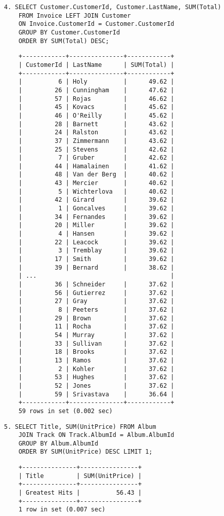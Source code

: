 \documentclass{article}
\begin{document}
\begin{lstlisting}
4. SELECT Customer.CustomerId, Customer.LastName, SUM(Total)
    FROM Invoice LEFT JOIN Customer
    ON Invoice.CustomerId = Customer.CustomerId
    GROUP BY Customer.CustomerId
    ORDER BY SUM(Total) DESC;
\end{lstlisting}

\begin{lstlisting}
    +------------+---------------+------------+
    | CustomerId | LastName      | SUM(Total) |
    +------------+---------------+------------+
    |          6 | Holy          |      49.62 |
    |         26 | Cunningham    |      47.62 |
    |         57 | Rojas         |      46.62 |
    |         45 | Kovacs        |      45.62 |
    |         46 | O'Reilly      |      45.62 |
    |         28 | Barnett       |      43.62 |
    |         24 | Ralston       |      43.62 |
    |         37 | Zimmermann    |      43.62 |
    |         25 | Stevens       |      42.62 |
    |          7 | Gruber        |      42.62 |
    |         44 | Hamalainen    |      41.62 |
    |         48 | Van der Berg  |      40.62 |
    |         43 | Mercier       |      40.62 |
    |          5 | Wichterlova   |      40.62 |
    |         42 | Girard        |      39.62 |
    |          1 | Goncalves     |      39.62 |
    |         34 | Fernandes     |      39.62 |
    |         20 | Miller        |      39.62 |
    |          4 | Hansen        |      39.62 |
    |         22 | Leacock       |      39.62 |
    |          3 | Tremblay      |      39.62 |
    |         17 | Smith         |      39.62 |
    |         39 | Bernard       |      38.62 |
    | ...                                     |
    |         36 | Schneider     |      37.62 |
    |         56 | Gutierrez     |      37.62 |
    |         27 | Gray          |      37.62 |
    |          8 | Peeters       |      37.62 |
    |         29 | Brown         |      37.62 |
    |         11 | Rocha         |      37.62 |
    |         54 | Murray        |      37.62 |
    |         33 | Sullivan      |      37.62 |
    |         18 | Brooks        |      37.62 |
    |         13 | Ramos         |      37.62 |
    |          2 | Kohler        |      37.62 |
    |         53 | Hughes        |      37.62 |
    |         52 | Jones         |      37.62 |
    |         59 | Srivastava    |      36.64 |
    +------------+---------------+------------+
    59 rows in set (0.002 sec)
\end{lstlisting}

\begin{lstlisting}
5. SELECT Title, SUM(UnitPrice) FROM Album
    JOIN Track ON Track.AlbumId = Album.AlbumId
    GROUP BY Album.AlbumId
    ORDER BY SUM(UnitPrice) DESC LIMIT 1;
\end{lstlisting}
\begin{lstlisting}
    +---------------+----------------+
    | Title         | SUM(UnitPrice) |
    +---------------+----------------+
    | Greatest Hits |          56.43 |
    +---------------+----------------+
    1 row in set (0.007 sec)
\end{lstlisting}
\end{document}
